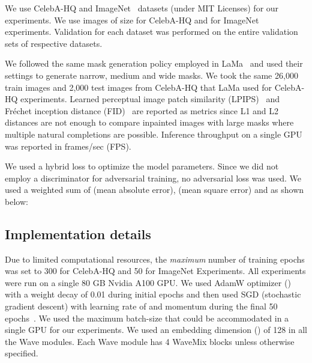 \documentclass{article}
\begin{document}
We use CelebA-HQ\cite{karras2018progressive} and ImageNet~\cite{5206848} datasets (under MIT Licenses) for our experiments. We use images of size  for CelebA-HQ and  for ImageNet experiments. Validation for each dataset was performed on the entire validation sets of respective datasets. 

We followed the same mask generation policy employed in LaMa~\cite{Lama_2021} and used their settings to generate narrow, medium and wide masks. We took the same 26,000 train images and 2,000 test images from CelebA-HQ that LaMa used for CelebA-HQ experiments. Learned perceptual image patch similarity (LPIPS)~\cite{zhang2018unreasonable} and Fr\'echet inception distance (FID)~\cite{heusel2018gans} are reported as metrics since L1 and L2 distances are not enough to compare inpainted images with large masks where multiple natural completions are possible. Inference throughput on a single GPU was reported in frames/sec (FPS). 

We used a hybrid loss  to optimize the model parameters. Since we did not employ a discriminator for adversarial training, no adversarial loss was used. We used a weighted sum of  (mean absolute error),  (mean square error) and  as shown below:

 


\subsection{Implementation details}


Due to limited computational resources, the \emph{maximum} number of training epochs was set to 300 for CelebA-HQ and 50 for ImageNet Experiments. All experiments were run on a single 80 GB Nvidia A100 GPU. We used AdamW optimizer () with a weight decay of 0.01 during initial epochs and then used SGD (stochastic gradient descent) with learning rate of  and momentum  during the final 50 epochs~\cite{DBLP:journals/corr/abs-1712-07628, jeevan2022convolutional}. We used the maximum batch-size that could be accommodated in a single GPU for our experiments. We used an embedding dimension () of 128 in all the Wave modules. Each Wave module has 4 WaveMix blocks unless otherwise specified. 
\end{document}
